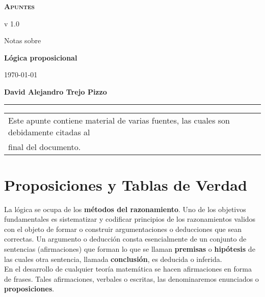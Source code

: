\documentclass[a4paper,11pt,oneside,titlepage,final]{scrartc}
\newcommand{\centeredelement}[2][]{\begingroup\centering#1#2\par\endgroup}
\begin{document}
\begin{titlepage}
\setlength{\parindent}{0pt}

\begin{flushright}
{\bfseries\scshape Apuntes}\\
{\small\sffamily v 1.0\par}
\end{flushright}


\centeredelement[\huge]{%
  Notas sobre
}


\centeredelement[\huge\bfseries]{%
   Lógica proposicional
}


\centeredelement{\today}


\textbf{David Alejandro Trejo Pizzo}
\par
\smallskip
\hrule
\smallskip
\begin{tabular}{@{}ll@{}}
Este apunte contiene material de varias fuentes, las cuales son debidamente citadas al\\ final del documento.\\ 
\end{tabular}
\end{titlepage}

\newpage

\tableofcontents
\newpage


\section{Proposiciones y Tablas de Verdad}

La lógica se ocupa de los \textbf{métodos del razonamiento}. Uno de los objetivos fundamentales es sistematizar y codificar principios de los razonamientos validos con el objeto de formar o construir argumentaciones o deducciones que sean correctas. Un argumento o deducción consta esencialmente de un conjunto de sentencias (afirmaciones) que forman lo que se llaman \textbf{premisas} o \textbf{hipótesis} de las cuales otra sentencia, llamada \textbf{conclusión}, es deducida o inferida.\\

En el desarrollo de cualquier teoría matemática se hacen afirmaciones en forma de frases. Tales afirmaciones, verbales o escritas, las denominaremos enunciados o \textbf{proposiciones}.\\
\end{document}
